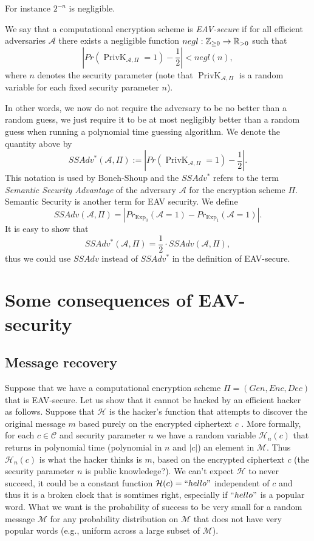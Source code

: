 \documentclass[twoside, a4paper, 10pt]{amsart}
\begin{document}
For instance $2^{-n}$ is negligible.

\begin{mydef} We say that a computational encryption scheme is \textit{EAV-secure} if for all efficient adversaries $\mathcal{A}$ there exists a negligible function $negl:\mathbb{Z}_{\geq 0} \to \mathbb{R}_{>0}$ such that $$\left | Pr(\operatorname{PrivK}_{\mathcal{A}, \Pi} = 1) - \frac{1}{2} \right | < negl(n), $$ where $n$ denotes the security parameter (note that $\operatorname{PrivK}_{\mathcal{A}, \Pi}$ is a random variable for each fixed security parameter $n$).

\end{mydef}

In other words, we now do not require the adversary to be no better than a random guess, we just require it to be at most negligibly better than a random guess when running a polynomial time guessing algorithm. We denote the quantity above by  $$SSAdv^*(\mathcal{A}, \Pi) := \left | Pr(\operatorname{PrivK}_{\mathcal{A}, \Pi} = 1) - \frac{1}{2} \right |.$$ This notation is used by Boneh-Shoup and the $SSAdv^*$ refers to the term \textit{Semantic Security Advantage} of the adversary $\mathcal{A}$ for the encryption scheme $\Pi$. Semantic Security is another term for EAV security. We define $$SSAdv(\mathcal{A}, \Pi) = \left | Pr_{\operatorname{Exp}_0}(\mathcal{A} = 1) - Pr_{\operatorname{Exp}_1}(\mathcal{A} = 1) \right |. $$ It is easy to show that $$SSAdv^*(\mathcal{A}, \Pi) = \frac{1}{2} \cdot SSAdv(\mathcal{A}, \Pi),$$ thus we could use $SSAdv$ instead of $SSAdv^*$ in the definition of EAV-secure.

\section{Some consequences of EAV-security}

\subsection{Message recovery} Suppose that we have a computational encryption scheme $\Pi = (Gen, Enc, Dec)$ that is EAV-secure. Let us show that it cannot be hacked by an efficient hacker as follows. Suppose that $\mathcal{H}$ is the hacker's function that attempts to discover the original message $m$ based purely on the encrypted ciphertext $c$ . More formally, for each $c \in \mathcal{C}$ and security parameter $n$ we have a random variable $\mathcal{H}_n(c)$ that returns in polynomial time (polynomial in $n$ and $|c|$) an element in $\mathcal{M}$. Thus $\mathcal{H}_n(c)$ is what the hacker thinks is $m$, based on the encrypted ciphertext $c$ (the security parameter $n$ is public knowledege?). We can't expect $\mathcal{H}$ to never succeed, it could be a constant function $\mathcal{H}(c) = ``hello"$ independent of $c$ and thus it is a broken clock that is somtimes right, especially if $``hello"$ is a popular word. What we want is the probability of success to be very small for a random message $\mathcal{M}$ for any probability distribution on $\mathcal{M}$ that does not have very popular words (e.g., uniform across a large subset of $\mathcal{M}$).
\end{document}
